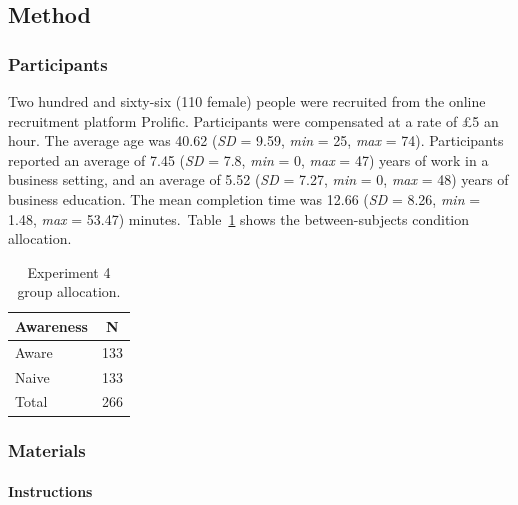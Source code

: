 \documentclass[a4paper, nobind, dvipsnames]{templates/ociamthesis}
\theoremstyle{definition}
\theoremstyle{definition}
\theoremstyle{definition}
\theoremstyle{definition}
\theoremstyle{remark}
\begin{document}
\subsection{Method}

\subsubsection{Participants}

Two hundred and sixty-six (110 female) people were recruited from the online recruitment platform Prolific. Participants were compensated at a rate of £5 an hour. The average age was 40.62 (\emph{SD} = 9.59, \emph{min} = 25, \emph{max} = 74). Participants reported an average of 7.45 (\emph{SD} = 7.8, \emph{min} = 0, \emph{max} = 47) years of work in a business setting, and an average of 5.52 (\emph{SD} = 7.27, \emph{min} = 0, \emph{max} = 48) years of business education. The mean completion time was 12.66 (\emph{SD} = 8.26, \emph{min} = 1.48, \emph{max} = 53.47) minutes.~Table~\ref{tab:condition-allocation-aggregation-4}
shows the between-subjects condition allocation.

\begin{table}[tbp]

\begin{center}
\begin{threeparttable}

\caption{\label{tab:condition-allocation-aggregation-4}Experiment 4 group allocation.}

\begin{tabular}{ll}
\toprule
Awareness & \multicolumn{1}{c}{N}\\
\midrule
Aware & 133\\
Naive & 133\\
Total & 266\\
\bottomrule
\end{tabular}

\end{threeparttable}
\end{center}

\end{table}

\subsubsection{Materials}

\paragraph{Instructions}
\end{document}

